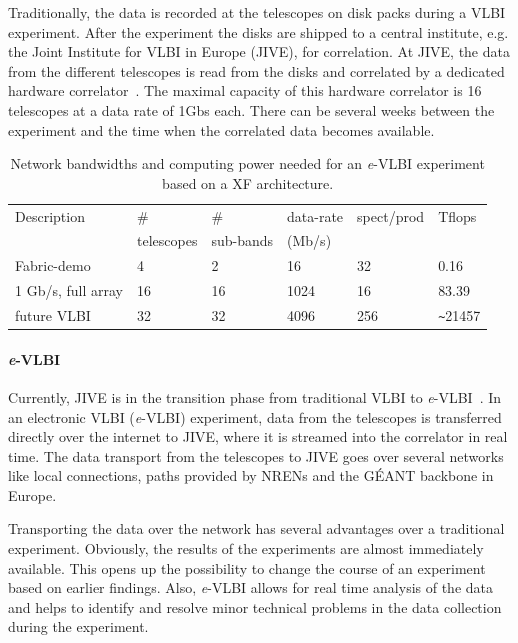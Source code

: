 Traditionally, the data is recorded at the telescopes on
disk packs during a VLBI experiment. After the experiment the disks
are shipped to a central institute, e.g. the Joint Institute for VLBI
in Europe (JIVE), for correlation. At JIVE, the data from the
different telescopes is read from the disks and correlated by a
dedicated hardware correlator~\cite{EVNCorrelator}. The maximal
capacity of this hardware correlator is 16 telescopes at a data rate
of 1Gbs each.  There can be several weeks between the experiment and
the time when the correlated data becomes available.

\begin{table}
  \centering
  \begin{tabular}[c]{|l|l|l|l|l|l|}
    \hline
    Description & \# & \#  & data-rate & spect/prod & Tflops\\
    & telescopes & sub-bands & (Mb/s) &  & \\
    \hline
    \hline
    Fabric-demo &4 &2 &16 &32 &0.16\\
    1 Gb/s, full array  &16 &16 &1024 &16 &83.39\\
    future VLBI &32 &32 &4096 &256 &\verb|~|21457\\
    \hline
  \end{tabular}
  \caption{Network bandwidths and computing power needed for an {\it e}-VLBI
    experiment based on a XF architecture.}
  \label{tab:speed}
\end{table}
\paragraph{{\it e}-VLBI}
Currently, JIVE is in the transition phase from traditional VLBI to
{\it e}-VLBI~\cite{szomoru-2004}. In an electronic VLBI ({\it e}-VLBI)
experiment, data from the telescopes is transferred directly over the
internet to JIVE, where it is streamed into the correlator in real
time. The data transport from the telescopes to JIVE goes over several
networks like local connections, paths provided by NRENs and the
G\'EANT backbone in Europe.

Transporting the data over the network has several advantages over a
traditional experiment. Obviously, the results of the experiments are
almost immediately available. This opens up the possibility to change
the course of an experiment based on earlier findings. Also, {\it
  e}-VLBI allows for real time analysis of the data and helps to
identify and resolve minor technical problems in the data collection
during the experiment.

